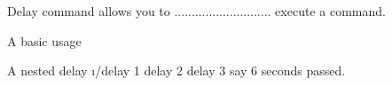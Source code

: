 Delay command allows you to ............................ execute a command.


\begin{example}{A basic usage}
\end{example}

\begin{example}{A nested delay}
    \i{/delay 1 delay 2 delay 3 say 6 seconds passed.}
\end{example}